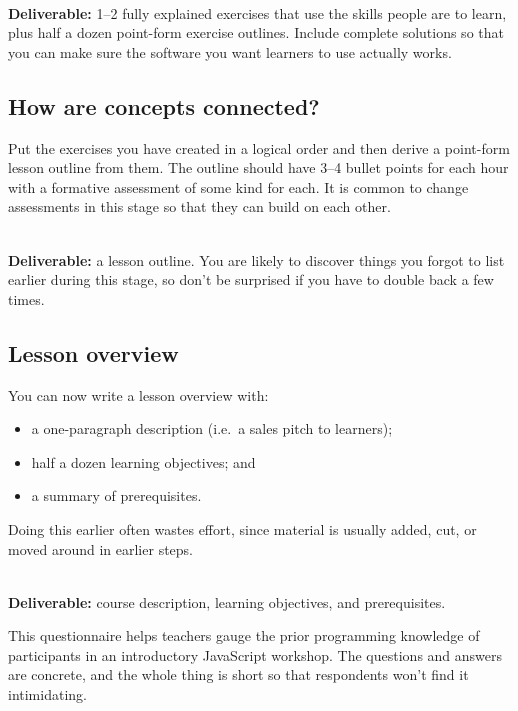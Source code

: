 ~\\
\noindent
\textbf{Deliverable:} 1--2 fully explained exercises
that use the skills people are to learn,
plus half a dozen point-form exercise outlines.
Include complete solutions
so that you can make sure the software you want learners to use actually works.

\subsection*{How are concepts connected?}

Put the exercises you have created in a logical order
and then derive a point-form lesson outline from them.
The outline should have 3--4 bullet points for each hour
with a formative assessment of some kind for each.
It is common to change assessments in this stage
so that they can build on each other.

~\\
\noindent
\textbf{Deliverable:} a lesson outline.
You are likely to discover things you forgot to list earlier during this stage,
so don't be surprised if you have to double back a few times.

\subsection*{Lesson overview}

You can now write a lesson overview with:

\begin{itemize}

\item
  a one-paragraph description (i.e.\ a sales pitch to learners);

\item
  half a dozen learning objectives; and

\item
  a summary of prerequisites.

\end{itemize}

Doing this earlier often wastes effort,
since material is usually added, cut, or moved around in earlier steps.

~\\
\noindent
\textbf{Deliverable:}
course description,
learning objectives,
and prerequisites.


This questionnaire helps teachers gauge the prior programming knowledge
of participants in an introductory JavaScript workshop.
The questions and answers are concrete,
and the whole thing is short so that respondents won't find it intimidating.


